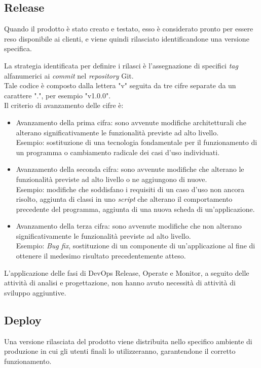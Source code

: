 \subsection{Release}
Quando il prodotto è stato creato e testato, esso è considerato pronto per essere reso disponibile ai clienti, e viene quindi rilasciato identificandone una versione specifica.

La strategia identificata per definire i rilasci è l'assegnazione di specifici \emph{tag} alfanumerici ai \emph{commit} nel \emph{repository} Git.\\
Tale codice è composto dalla lettera "v" seguita da tre cifre separate da un carattere ".", per esempio "v1.0.0".\\
Il criterio di avanzamento delle cifre è: 
\begin{itemize}
    \item Avanzamento della prima cifra: sono avvenute modifiche architetturali che alterano significativamente le funzionalità previste ad alto livello.\\
    Esempio: sostituzione di una tecnologia fondamentale per il funzionamento di un programma o cambiamento radicale dei casi d'uso individuati.  
    \item Avanzamento della seconda cifra: sono avvenute modifiche che alterano le funzionalità previste ad alto livello o ne aggiungono di nuove.\\
    Esempio: modifiche che soddisfano i requisiti di un caso d'uso non ancora risolto, aggiunta di classi in uno \emph{script} che alterano il comportamento precedente del programma, aggiunta di una nuova scheda di un'applicazione.
    \item Avanzamento della terza cifra: sono avvenute modifiche che non alterano significativamente le funzionalità previste ad alto livello.\\
    Esempio: \emph{Bug fix}, sostituzione di un componente di un'applicazione al fine di ottenere il medesimo risultato precedentemente atteso. 
\end{itemize}
    
L'applicazione delle fasi di \gls{DevOps} Release, Operate e Monitor, a seguito delle attività di analisi e progettazione, non hanno avuto necessità di attività di sviluppo aggiuntive. 


\subsection{Deploy}
Una versione rilasciata del prodotto viene distribuita nello specifico ambiente di produzione in cui gli utenti finali lo utilizzeranno, garantendone il corretto funzionamento.


